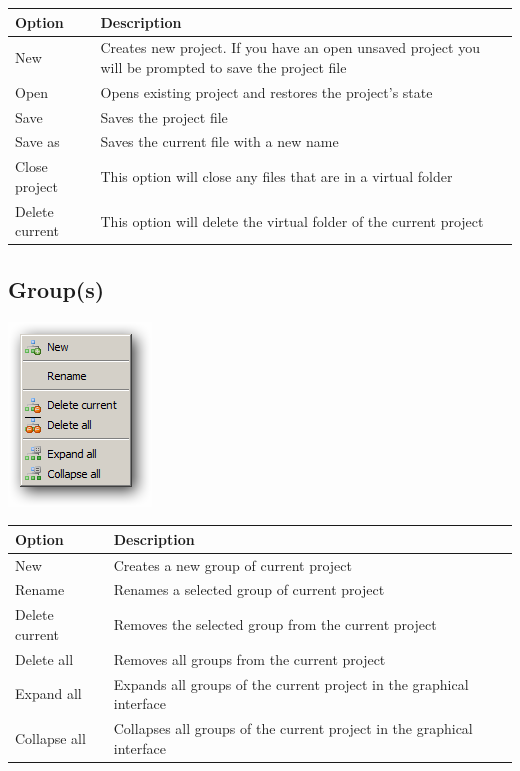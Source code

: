 \begin{scriptsize}\begin{tabularx}{\textwidth}{>{\hsize=0.2\hsize}X>{\hsize=0.8\hsize}X}\\
    \hline
    \textbf{Option} & \textbf{Description} \\
    \hline
    New & Creates new project. If you have an open unsaved project you will be prompted to save the project file \\
    Open & Opens existing project and restores the project's state \\
    Save & Saves the project file \\
    Save as & Saves the current file with a new name \\
    Close project & This option will close any files that are in a virtual folder \\
    Delete current & This option will delete the virtual folder of the current project \\
    \hline
  \end{tabularx}\end{scriptsize}


\newpage
\hypertarget{menu_project_group}{}
\subsection{Group(s)}

\includegraphics[scale=0.50]{./res/menu_project_group.png}\\

\begin{scriptsize}\begin{tabularx}{\textwidth}{>{\hsize=0.2\hsize}X>{\hsize=0.8\hsize}X}\\
    \hline
    \textbf{Option} & \textbf{Description} \\
    \hline
    New & Creates a new group of current project \\
    Rename & Renames a selected group of current project \\
    Delete current & Removes the selected group from the current project \\
    Delete all & Removes all groups from the current project \\
    Expand all & Expands all groups of the current project in the graphical interface \\
    Collapse all & Collapses all groups of the current project in the graphical interface \\
    \hline
  \end{tabularx}\end{scriptsize}


